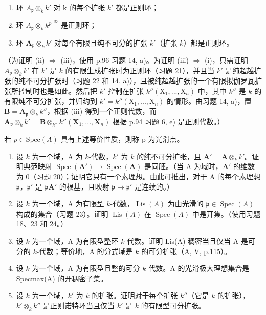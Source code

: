 \begin{enumerate}
\def\labelenumi{(\roman{enumi})}
\item
  环 \(A_{\mathfrak{p}} \otimes_{k} k'\) 对 k 的每个扩张 \(k'\) 都是正则环；
\item
  环 \(A_{\mathfrak{p}} \otimes_{k} k^{p^{-\infty}}\) 是正则环；
\item
  环 \(\mathbf{A}_{\mathfrak{p}} \otimes_{k} k'\) 对每个有限且纯不可分的扩张 \(k'\)（扩张 \(k\)）都是正则环。
\end{enumerate}

 （为证明 (ii) \(\Rightarrow\) (iii)，使用 p.96 习题 14, a)。为证明 (iii) \(\Rightarrow\) (i)，只需证明 \(A_{\mathfrak p} \otimes_k k'\) 在 \(k'\) 是 \(k\) 的有限生成扩张时为正则环（习题 21），并且当 \(k'\) 是纯超越扩张的纯不可分扩张时（习题 22 和 14, a)），且被纯超越扩张的一个有限拟伽罗瓦扩张所控制时也是如此。然后把 \(k'\) 控制在扩张 \(k''(\mathrm{X}_1, ..., \mathrm{X}_n)\) 中，其中 \(k''\) 是 \(k\) 的有限纯不可分扩张，并归约到 \(k' = k''(\mathrm{X}_1, ..., \mathrm{X}_n)\) 的情形。由习题 14, a)，置 \(\mathbf{B} = \mathbf{A}_{\mathfrak{p}} \otimes_k k''\)，根据 (iii) 得到一个正则代数，而 \(\mathbf{A}_{\mathfrak{p}} \otimes_k k' = \mathbf{B} \otimes_{k''} k''(\mathbf{X}_1, ..., \mathbf{X}_n)\) 根据 p.94 习题 6, e) 是正则代数。）

若 \(p \in \text{Spec}(A)\) 具有上述等价性质，则称 p 为光滑点。

\begin{enumerate}
\def\labelenumi{\arabic{enumi})}
\setcounter{enumi}{23}
\item
  设 \(k\) 为一个域，A 为 \(k\)-代数，\(k'\) 为 \(k\) 的纯不可分扩张，且 \(\mathbf{A}' = \mathbf{A} \otimes_k k'\)。证明典范映射 \(\operatorname{Spec}(\mathbf{A}') \to \operatorname{Spec}(\mathbf{A})\) 是同胚。（当 A 为域时，\(\mathbf{A}'\) 的维数为 0（习题 20）；证明它只有一个素理想。由此可推出，对于 A 的每个素理想 \(\mathfrak{p}\)，\(\mathfrak{p}'\) 是 \(\mathfrak{p}\mathbf{A}'\) 的根基，且映射 \(\mathfrak{p} \mapsto \mathfrak{p}'\) 是连续的。）
\item
  设 \(k\) 为一个域，A 为有限型 \(k\)-代数，\(\operatorname{Lis}(A)\) 为由光滑的 \(\mathfrak{p} \in \operatorname{Spec}(A)\) 构成的集合（习题 23）。证明 \(\operatorname{Lis}(A)\) 在 \(\operatorname{Spec}(A)\) 中是开集。（使用习题 18、23 和 24。）
\item
  设 \(k\) 为一个域，A 为有限型整环 \(k\)-代数。证明 Lis(A) 稠密当且仅当 A 是可分的 \(k\)-代数；等价地，A 的分式域是 \(k\) 的可分扩张（A, V, p.115）。
\item
  设 \(k\) 为一个域，A 为有限型且整的可分 \(k\)-代数。A 的光滑极大理想集合是 Specmax(A) 的开稠密子集。
\item
  设 \(k\) 为一个域，\(k'\) 为 \(k\) 的扩张。证明对于每个扩张 \(k''\)（它是 \(k\) 的扩张），\(k' \otimes_k k''\) 是正则诺特环当且仅当 \(k'\) 是 \(k\) 的有限型可分扩张。
\end{enumerate}

